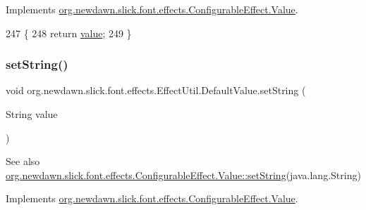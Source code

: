 Implements \mbox{\hyperlink{interfaceorg_1_1newdawn_1_1slick_1_1font_1_1effects_1_1_configurable_effect_1_1_value_a08be303b8f3992da862325722d0b234f}{org.\+newdawn.\+slick.\+font.\+effects.\+Configurable\+Effect.\+Value}}.


\begin{DoxyCode}
247                                   \{
248             \textcolor{keywordflow}{return} \mbox{\hyperlink{classorg_1_1newdawn_1_1slick_1_1font_1_1effects_1_1_effect_util_1_1_default_value_a0bc4a9aca1a1dd586fe8580d9e68c8fd}{value}};
249         \}
\end{DoxyCode}
\mbox{\label{classorg_1_1newdawn_1_1slick_1_1font_1_1effects_1_1_effect_util_1_1_default_value_af466ff9656f4b53ef10d130ba0b366a1}} 
\subsubsection{\texorpdfstring{set\+String()}{setString()}}
{\footnotesize\ttfamily void org.\+newdawn.\+slick.\+font.\+effects.\+Effect\+Util.\+Default\+Value.\+set\+String (\begin{DoxyParamCaption}\item[{String}]{value }\end{DoxyParamCaption})\hspace{0.3cm}{\ttfamily [inline]}}

\begin{DoxySeeAlso}{See also}
\mbox{\hyperlink{interfaceorg_1_1newdawn_1_1slick_1_1font_1_1effects_1_1_configurable_effect_1_1_value_a124f421b2240f17756a9256b82d315a5}{org.\+newdawn.\+slick.\+font.\+effects.\+Configurable\+Effect.\+Value\+::set\+String}}(java.\+lang.\+String) 
\end{DoxySeeAlso}


Implements \mbox{\hyperlink{interfaceorg_1_1newdawn_1_1slick_1_1font_1_1effects_1_1_configurable_effect_1_1_value_a124f421b2240f17756a9256b82d315a5}{org.\+newdawn.\+slick.\+font.\+effects.\+Configurable\+Effect.\+Value}}.


